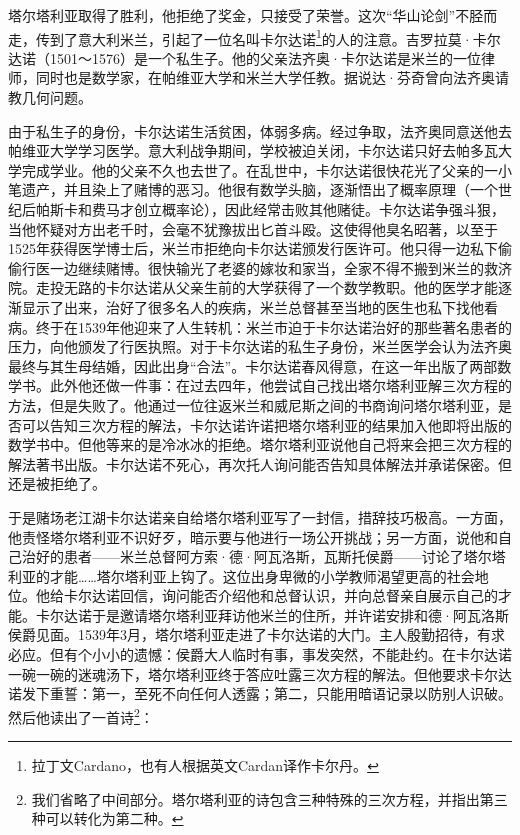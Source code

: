 \documentclass[b5paper]{ctexart}
\begin{document}
塔尔塔利亚取得了胜利，他拒绝了奖金，只接受了荣誉。这次“华山论剑”不胫而走，传到了意大利米兰，引起了一位名叫卡尔达诺\footnote{拉丁文Cardano，也有人根据英文Cardan译作卡尔丹。}的人的注意。吉罗拉莫·卡尔达诺（1501～1576）是一个私生子。他的父亲法齐奥·卡尔达诺是米兰的一位律师，同时也是数学家，在帕维亚大学和米兰大学任教。据说达·芬奇曾向法齐奥请教几何问题。

由于私生子的身份，卡尔达诺生活贫困，体弱多病。经过争取，法齐奥同意送他去帕维亚大学学习医学。意大利战争期间，学校被迫关闭，卡尔达诺只好去帕多瓦大学完成学业。他的父亲不久也去世了。在乱世中，卡尔达诺很快花光了父亲的一小笔遗产，并且染上了赌博的恶习。他很有数学头脑，逐渐悟出了概率原理（一个世纪后帕斯卡和费马才创立概率论），因此经常击败其他赌徒。卡尔达诺争强斗狠，当他怀疑对方出老千时，会毫不犹豫拔出匕首斗殴。这使得他臭名昭著，以至于1525年获得医学博士后，米兰市拒绝向卡尔达诺颁发行医许可。他只得一边私下偷偷行医一边继续赌博。很快输光了老婆的嫁妆和家当，全家不得不搬到米兰的救济院。走投无路的卡尔达诺从父亲生前的大学获得了一个数学教职。他的医学才能逐渐显示了出来，治好了很多名人的疾病，米兰总督甚至当地的医生也私下找他看病。终于在1539年他迎来了人生转机：米兰市迫于卡尔达诺治好的那些著名患者的压力，向他颁发了行医执照。对于卡尔达诺的私生子身份，米兰医学会认为法齐奥最终与其生母结婚，因此出身“合法”。卡尔达诺春风得意，在这一年出版了两部数学书。此外他还做一件事：在过去四年，他尝试自己找出塔尔塔利亚解三次方程的方法，但是失败了。他通过一位往返米兰和威尼斯之间的书商询问塔尔塔利亚，是否可以告知三次方程的解法，卡尔达诺许诺把塔尔塔利亚的结果加入他即将出版的数学书中。但他等来的是冷冰冰的拒绝。塔尔塔利亚说他自己将来会把三次方程的解法著书出版。卡尔达诺不死心，再次托人询问能否告知具体解法并承诺保密。但还是被拒绝了。

于是赌场老江湖卡尔达诺亲自给塔尔塔利亚写了一封信，措辞技巧极高。一方面，他责怪塔尔塔利亚不识好歹，暗示要与他进行一场公开挑战；另一方面，说他和自己治好的患者——米兰总督阿方索·德·阿瓦洛斯，瓦斯托侯爵——讨论了塔尔塔利亚的才能……塔尔塔利亚上钩了。这位出身卑微的小学教师渴望更高的社会地位。他给卡尔达诺回信，询问能否介绍他和总督认识，并向总督亲自展示自己的才能。卡尔达诺于是邀请塔尔塔利亚拜访他米兰的住所，并许诺安排和德·阿瓦洛斯侯爵见面。1539年3月，塔尔塔利亚走进了卡尔达诺的大门。主人殷勤招待，有求必应。但有个小小的遗憾：侯爵大人临时有事，事发突然，不能赴约。在卡尔达诺一碗一碗的迷魂汤下，塔尔塔利亚终于答应吐露三次方程的解法。但他要求卡尔达诺发下重誓：第一，至死不向任何人透露；第二，只能用暗语记录以防别人识破。然后他读出了一首诗\footnote{我们省略了中间部分。塔尔塔利亚的诗包含三种特殊的三次方程，并指出第三种可以转化为第二种。}：
\end{document}
